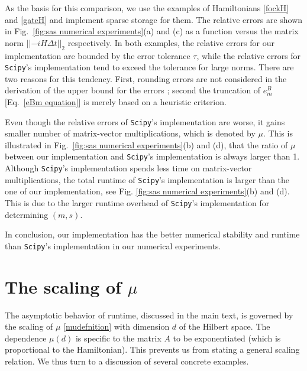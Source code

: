 \documentclass[letterpaper,10pt]{iopart}
\newcommand{\norm}[1]{\left|\left|#1\right|\right|}
\begin{document}
As the basis for this comparison, we use the examples of Hamiltonians \eqref{fockH} and \eqref{gateH} and implement sparse storage for them. The relative errors are shown in Fig.\ \ref{fig:sas numerical experiments}(a) and (c) as a function  versus the matrix norm $\norm{-iH\Delta t}_2$ respectively. In both examples, the relative errors for our implementation are bounded by the error tolerance $\tau$, while the relative errors for \texttt{Scipy}'s implementation tend to exceed the tolerance for large norms. There are two reasons for this tendency. First, rounding errors are not considered in the derivation of the upper bound for the errors \cite{al2011computing}; second the truncation of $e^B_m$ [Eq.\ \eqref{eBm equation}] is merely based on a heuristic criterion. 

Even though the relative errors of \texttt{Scipy}'s implementation are worse, it gains smaller number of matrix-vector multiplications, which is denoted by $\mu$. This is illustrated in Fig.\ \ref{fig:sas numerical experiments}(b) and (d), that the ratio of $\mu$ between our implementation and \texttt{Scipy}'s implementation is always larger than 1. Although \texttt{Scipy}'s implementation spends less time on matrix-vector multiplications, the total runtime of \texttt{Scipy}'s implementation is larger than the one of our implementation, see Fig. \ref{fig:sas numerical experiments}(b) and (d). This is due to the larger runtime overhead of \texttt{Scipy}'s implementation for determining $(m,s)$. 

In conclusion, our implementation has the better numerical stability and runtime than \texttt{Scipy}'s implementation in our numerical experiments. 



\section{The scaling of $\mu$}
\label{runtimescalingofUpsi}
The asymptotic behavior of runtime, discussed in the main text, is governed by the scaling of $\mu$ \eqref{mudefnition} with dimension $d$ of the Hilbert space. The dependence $\mu(d)$ is specific to the matrix $A$ to be exponentiated (which is proportional to the Hamiltonian). This prevents us from stating a general scaling relation. We thus turn to a discussion of several concrete examples. 
\end{document}

